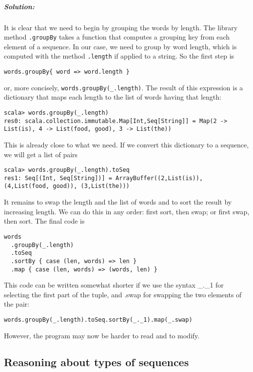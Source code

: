 \subparagraph{Solution:}

It is clear that we need to begin by grouping the words by length.
The library method \lstinline!.groupBy!
takes a function that computes a grouping key from each element of
a sequence. In our case, we need to group by word length, which is
computed with the method \lstinline!.length!
if applied to a string. So the first step is
\begin{lstlisting}
words.groupBy{ word => word.length }
\end{lstlisting}
or, more concisely, \lstinline!words.groupBy(_.length)!.
The result of this expression is a dictionary that maps each length
to the list of words having that length:
\begin{lstlisting}
scala> words.groupBy(_.length)
res0: scala.collection.immutable.Map[Int,Seq[String]] = Map(2 -> List(is), 4 -> List(food, good), 3 -> List(the))
\end{lstlisting}
This is already close to what we need. If we convert this dictionary
to a sequence, we will get a list of pairs
\begin{lstlisting}
scala> words.groupBy(_.length).toSeq
res1: Seq[(Int, Seq[String])] = ArrayBuffer((2,List(is)), (4,List(food, good)), (3,List(the))) 
\end{lstlisting}
It remains to swap the length and the list of words and to sort the
result by increasing length. We can do this in any order: first sort,
then swap; or first swap, then sort. The final code is
\begin{lstlisting}
words
  .groupBy(_.length)
  .toSeq
  .sortBy { case (len, words) => len }
  .map { case (len, words) => (words, len) }
\end{lstlisting}
This code can be written somewhat shorter if we use the syntax \_.\_1
for selecting the first part of the tuple, and .swap for swapping
the two elements of the pair:
\begin{lstlisting}
words.groupBy(_.length).toSeq.sortBy(_._1).map(_.swap)
\end{lstlisting}
However, the program may now be harder to read and to modify.

\subsection{Reasoning about types of sequences}

